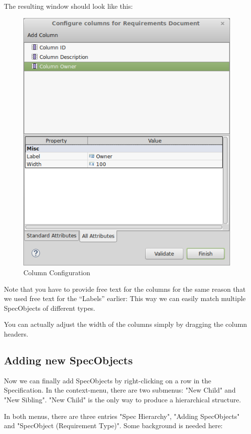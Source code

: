 The resulting window should look like this:

\begin{figure}[h!]
\centering      
\includegraphics[width=0.8\linewidth]{../rmf-images/columnconfig.png}      
\caption{Column Configuration}
\label{fig:column_configuration}
\end{figure}

Note that you have to provide free text for the columns for the same reason that we used free text for the ``Labels'' earlier: This way we can easily match multiple SpecObjects of different types.

You can actually adjust the width of the columns simply by dragging the column headers.

\subsection{Adding new SpecObjects}

Now we can finally add SpecObjects by right-clicking on a row in the Specification.  In the context-menu, there are two submenus: "New Child" and "New Sibling".  "New Child" is the only way to produce a hierarchical structure.

In both menus, there are three entries "Spec Hierarchy", "Adding SpecObjects" and "SpecObject (Requirement Type)".  Some background is needed here:

